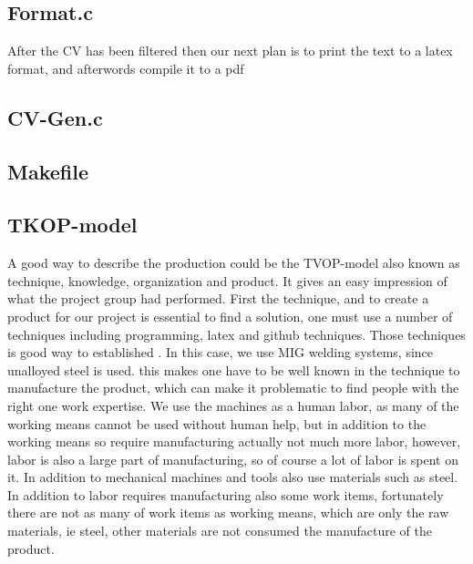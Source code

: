 \subsection{Format.c}
After the CV has been filtered then our next plan is to print the text to a latex format, and afterwords compile it to a pdf 

\subsection{CV-Gen.c}
\subsection{Makefile}

\subsection{TKOP-model}
A good way to describe the production could be the TVOP-model also known as technique, knowledge, organization and product.
It gives an easy impression of what the project group had performed.
First the technique, and to create a product for our project is essential to find a solution, 
one must use a number of techniques including programming, latex and github techniques.
Those techniques is good way to established . In this case, we use MIG welding systems, 
since unalloyed steel is used. this makes one have to be well known in the technique to
manufacture the product, which can make it problematic to find people with the right one
work expertise. We use the machines as a human labor, as many of
the working means cannot be used without human help, but in addition to the working means so require
manufacturing actually not much more labor, however, labor is also a large part of
manufacturing, so of course a lot of labor is spent on it. In addition to mechanical
machines and tools also use materials such as steel. In addition to labor requires
manufacturing also some work items, fortunately there are not as many of work items as
working means, which are only the raw materials, ie steel, other materials are not consumed
the manufacture of the product.